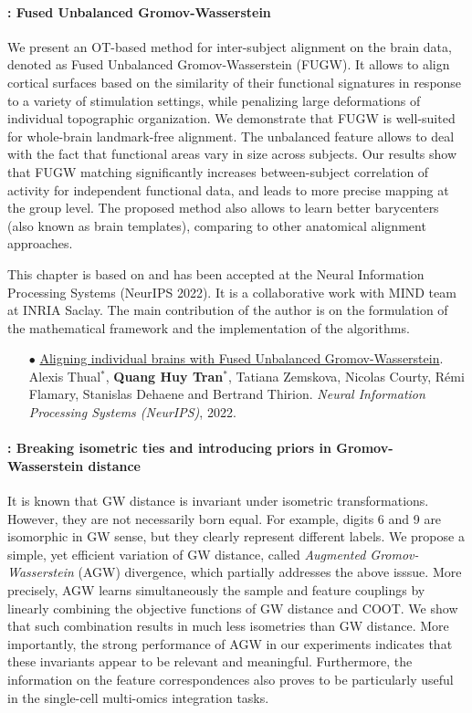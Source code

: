 \paragraph{: Fused Unbalanced Gromov-Wasserstein}

We present an OT-based method for inter-subject alignment on the brain data,
denoted as Fused Unbalanced Gromov-Wasserstein (FUGW). It allows to align cortical surfaces based
on the similarity of their functional signatures in response to a variety of stimulation settings,
while penalizing large deformations of individual topographic organization. We demonstrate that
FUGW is well-suited for whole-brain landmark-free alignment. The unbalanced feature allows
to deal with the fact that functional areas vary in size across subjects. Our results show that
FUGW matching significantly increases between-subject correlation of activity for independent
functional data, and leads to more precise mapping at the group level.
The proposed method also allows to learn better barycenters (also known as brain templates),
comparing to other anatomical alignment approaches.

This chapter is based on \citep{Thual22} and has been accepted at the
Neural Information Processing Systems (NeurIPS 2022).
It is a collaborative work with MIND team at INRIA Saclay.
The main contribution of the author is on the formulation of the mathematical framework
and the implementation of the algorithms.

\begin{itemize}
    \item[$\bullet$] \ul{Aligning individual brains with Fused Unbalanced Gromov-Wasserstein}.
     Alexis Thual$^*$, \textbf{Quang Huy Tran$^*$}, Tatiana Zemskova, Nicolas Courty,
     Rémi Flamary, Stanislas Dehaene and  Bertrand Thirion.
     \textit{Neural Information Processing Systems (NeurIPS)}, 2022.
\end{itemize}

\paragraph{: Breaking isometric ties and introducing priors in
Gromov-Wasserstein distance}

It is known that GW distance is invariant under isometric transformations. However,
they are not necessarily born equal. For example, digits 6 and 9 are isomorphic in GW sense,
but they clearly represent different labels. We propose a simple,
yet efficient variation of GW distance, called \textit{Augmented Gromov-Wasserstein} (AGW) divergence,
which partially addresses the above isssue.
More precisely, AGW learns simultaneously the sample and feature couplings by
linearly combining the objective functions of GW distance and COOT.
We show that such combination results in much less isometries than GW distance.
More importantly, the strong performance of AGW in our experiments indicates
that these invariants appear to be relevant and meaningful.
Furthermore, the information on the feature correspondences also proves to be particularly useful
in the single-cell multi-omics integration tasks.

